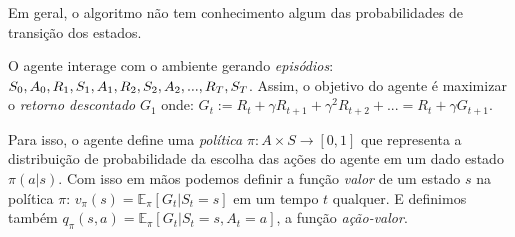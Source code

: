 Em geral, o algoritmo não tem conhecimento algum das probabilidades de transição dos estados.

O agente interage com o ambiente gerando \textit{episódios}: 
$S_0, A_0, R_1, S_1, A_1, R_2, S_2, A_2, ..., R_T, \\S_T$.
Assim, o objetivo do agente é maximizar o \textit{retorno descontado} $G_1$ onde:
$G_t := R_t + \gamma R_{t + 1} + \gamma^2R_{t + 2} + ... = R_t + \gamma G_{t + 1}$.

Para isso, o agente define uma \textit{política} $\pi: A \times S \to [0, 1]$ 
que representa a distribuição de probabilidade da escolha das ações do agente em um dado estado $\pi(a | s)$.
Com isso em mãos podemos definir a função \textit{valor} de um estado $s$ na política $\pi$: $v_{\pi}(s) = \mathbb{E}_{\pi}[G_t | S_t = s]$ em um tempo $t$ qualquer.
E definimos também $q_{\pi}(s, a) = \mathbb{E}_{\pi}[G_t | S_t = s, A_t = a]$, a função \textit{ação-valor}.